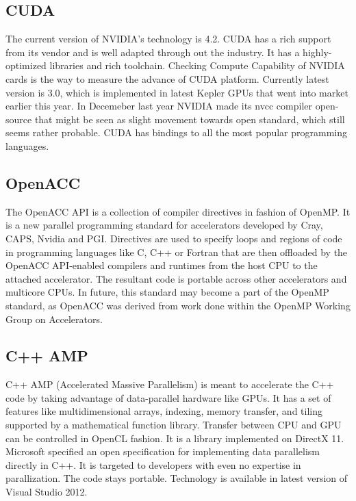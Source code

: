 \subsection{CUDA}
The current version of NVIDIA's technology is 4.2. CUDA has a rich support from its vendor and is well adapted through out the industry. It has a highly-optimized libraries and rich toolchain. Checking Compute Capability of NVIDIA cards is the way to measure the advance of CUDA platform. Currently latest version is 3.0, which is implemented in latest Kepler GPUs that went into market earlier this year. In Decemeber last year NVIDIA made its nvcc compiler open-source that might be seen as slight movement towards open standard, which still seems rather probable.\cite{hpcwire2012nvidia} CUDA has bindings to all the most popular programming languages.

\subsection{OpenACC}
The OpenACC API is a collection of compiler directives in fashion of OpenMP.\cite{openacc2012, openacc2012news2} It is a new parallel programming standard for accelerators developed by Cray, CAPS, Nvidia and PGI.  Directives are used to specify loops and regions of code in programming languages like C, C++ or Fortran that are then offloaded by the OpenACC API-enabled compilers and runtimes from the host CPU to the attached accelerator. The resultant code is portable across other accelerators and multicore CPUs. In future, this standard may become a part of the OpenMP standard, as OpenACC was derived from work done within the OpenMP Working Group on Accelerators.

\subsection{C++ AMP}
C++ AMP (Accelerated Massive Parallelism) is meant to accelerate the C++ code by taking advantage of data-parallel hardware like GPUs.\cite{microsoft2012cppamp, microsoft2012cppamp2} It has a set of features like multidimensional arrays, indexing, memory transfer, and tiling supported by a mathematical function library. Transfer between CPU and GPU can be controlled in OpenCL fashion. It is a library implemented on DirectX 11. Microsoft specified an open specification for implementing data parallelism directly in C++. It is targeted to developers with even no expertise in parallization. The code stays portable. Technology is available in latest version of Visual Studio 2012.

